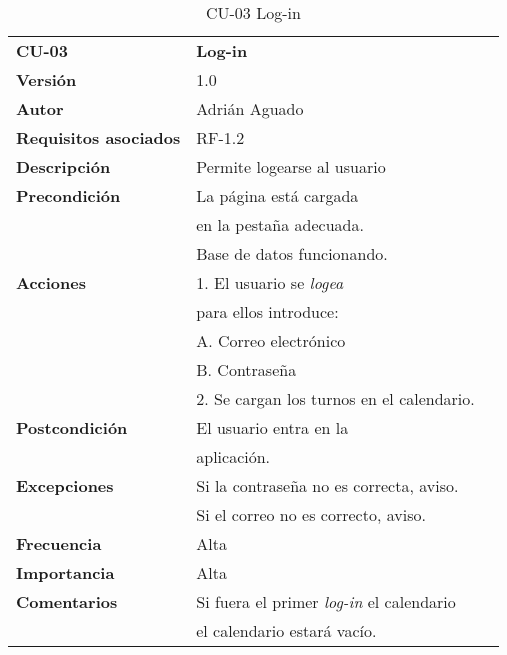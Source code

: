 \begin{table}[H]
\begin{tabular}{llr}  
\toprule
\begin{minipage}[b]{0.24\columnwidth}\raggedright\strut
\textbf{CU-03}\strut
\end{minipage} & \begin{minipage}[b]{0.72\columnwidth}\raggedright\strut
\textbf{Log-in}\strut
\end{minipage}\tabularnewline
\cmidrule(r){1-2}
\textbf{Versión}       & 1.0           \\
\textbf{Autor}       & Adrián  Aguado    \\
\textbf{Requisitos asociados}       & RF-1.2 \\ 
\textbf{Descripción} & Permite logearse al usuario\\
\textbf{Precondición} & La página está cargada \\
& en la pestaña adecuada.     \\
& Base de datos funcionando.       \\
\textbf{Acciones} & 1. El usuario se \emph{logea}\\
& para ellos introduce:\\
& A. Correo electrónico \\
& B. Contraseña\\
& 2. Se cargan los turnos en el calendario.\\
\textbf{Postcondición} & El usuario entra en la  \\
& aplicación.    \\
\textbf{Excepciones} &  Si la contraseña no es correcta, aviso. \\
&  Si el correo no es correcto, aviso. \\
\textbf{Frecuencia} & Alta            \\
\textbf{Importancia} & Alta            \\
\textbf{Comentarios } &  Si fuera el primer \emph{log-in} el calendario   \\
& el calendario estará vacío.\\
\bottomrule
\end{tabular}
\caption{CU-03 Log-in} 
\end{table}

